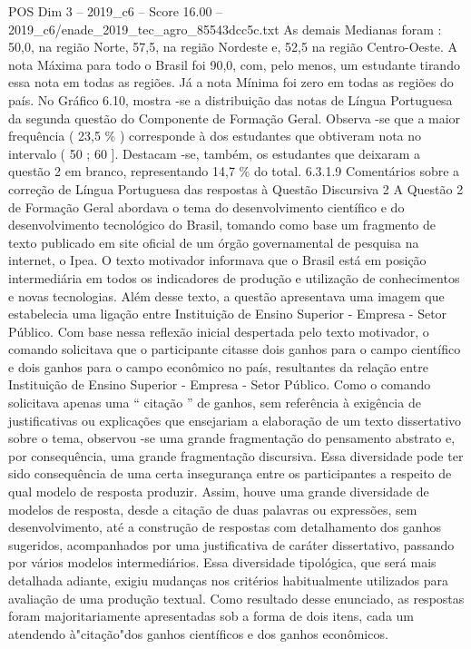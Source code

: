 \begin{textsample}{POS Dim 3 – 2019\_c6 – Score 16.00 – 2019\_c6/enade\_2019\_tec\_agro\_85543dcc5c.txt}
As demais Medianas foram : 50,0, na região Norte, 57,5, na região Nordeste e, 52,5 na região Centro-Oeste.
A nota Máxima para todo o Brasil foi 90,0, com, pelo menos, um estudante tirando essa nota em todas as regiões.
Já a nota Mínima foi zero em todas as regiões do país.
No Gráfico 6.10, mostra -se a distribuição das notas de Língua Portuguesa da segunda questão do Componente de Formação Geral.
Observa -se que a maior frequência ( 23,5 \% ) corresponde à dos estudantes que obtiveram nota no intervalo ( 50 ; 60 ].
Destacam -se, também, os estudantes que deixaram a questão 2 em branco, representando 14,7 \% do total. 6.3.1.9 Comentários sobre a correção de Língua Portuguesa das respostas à Questão Discursiva 2 A Questão 2 de Formação Geral abordava o tema do desenvolvimento científico e do desenvolvimento tecnológico do Brasil, tomando como base um fragmento de texto publicado em site oficial de um órgão governamental de pesquisa na internet, o Ipea.
O texto motivador informava que o Brasil está em posição intermediária em todos os indicadores de produção e utilização de conhecimentos e novas tecnologias.
Além desse texto, a questão apresentava uma imagem que estabelecia uma ligação entre Instituição de Ensino Superior - Empresa - Setor Público.
Com base nessa reflexão inicial despertada pelo texto motivador, o comando solicitava que o participante citasse dois ganhos para o campo científico e dois ganhos para o campo econômico no país, resultantes da relação entre Instituição de Ensino Superior - Empresa - Setor Público.
Como o comando solicitava apenas uma “ citação ” de ganhos, sem referência à exigência de justificativas ou explicações que ensejariam a elaboração de um texto dissertativo sobre o tema, observou -se uma grande fragmentação do pensamento abstrato e, por consequência, uma grande fragmentação discursiva.
Essa diversidade pode ter sido consequência de uma certa insegurança entre os participantes a respeito de qual modelo de resposta produzir.
Assim, houve uma grande diversidade de modelos de resposta, desde a citação de duas palavras ou expressões, sem desenvolvimento, até a construção de respostas com detalhamento dos ganhos sugeridos, acompanhados por uma justificativa de caráter dissertativo, passando por vários modelos intermediários.
Essa diversidade tipológica, que será mais detalhada adiante, exigiu mudanças nos critérios habitualmente utilizados para avaliação de uma produção textual.
Como resultado desse enunciado, as respostas foram majoritariamente apresentadas sob a forma de dois itens, cada um atendendo à"citação"dos ganhos científicos e dos ganhos econômicos.

\end{textsample}
